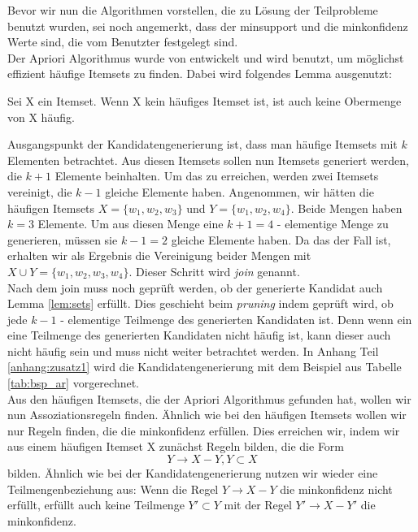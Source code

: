 Bevor wir nun die Algorithmen vorstellen, die zu Lösung der Teilprobleme benutzt wurden, sei noch angemerkt, dass der minsupport und die minkonfidenz Werte sind, die vom Benutzter festgelegt sind.
\\
Der Apriori Algorithmus wurde von \citet{AgImSw93} entwickelt und wird benutzt, um möglichst effizient häufige Itemsets zu finden. Dabei wird folgendes Lemma ausgenutzt:
\begin{lemma}
	Sei X ein Itemset. Wenn X kein häufiges Itemset ist, ist auch keine Obermenge von X häufig. \citep{AgImSw93}
	\label{lem:sets}
\end{lemma}
Ausgangspunkt der Kandidatengenerierung ist, dass man häufige Itemsets mit $k$ Elementen betrachtet. Aus diesen Itemsets sollen nun Itemsets generiert werden, die $k+1$ Elemente beinhalten. Um das zu erreichen, werden zwei Itemsets vereinigt, die $k-1$ gleiche Elemente haben. Angenommen, wir hätten die häufigen Itemsets $X = \{w_1, w_2, w_3\}$ und $Y = \{w_1, w_2, w_4\}$. Beide Mengen haben $k=3$ Elemente. Um aus diesen Menge eine $k+1=4$ - elementige Menge zu generieren, müssen sie $k-1=2$ gleiche Elemente haben. Da das der Fall ist, erhalten wir als Ergebnis die Vereinigung beider Mengen mit $X \cup Y = \{w_1, w_2, w_3, w_4\}$. Dieser Schritt wird \textit{join} genannt.\\
Nach dem join muss noch geprüft werden, ob der generierte Kandidat auch Lemma \ref{lem:sets} erfüllt. Dies geschieht beim \textit{pruning} indem geprüft wird, ob jede $k-1$ - elementige Teilmenge des generierten Kandidaten ist. Denn wenn ein eine Teilmenge des generierten Kandidaten nicht häufig ist, kann dieser auch nicht häufig sein und muss nicht weiter betrachtet werden. In Anhang Teil \ref{anhang:zusatz1} wird die Kandidatengenerierung mit dem Beispiel aus Tabelle \ref{tab:bsp_ar} vorgerechnet.
\\
Aus den häufigen Itemsets, die der Apriori Algorithmus gefunden hat, wollen wir nun Assoziationsregeln finden. Ähnlich wie bei den häufigen Itemsets wollen wir nur Regeln finden, die die minkonfidenz erfüllen. Dies erreichen wir, indem wir aus einem häufigen Itemset X zunächst Regeln bilden, die die Form 
\begin{equation*}
Y \rightarrow X - Y, Y \subset X
\end{equation*}
bilden. Ähnlich wie bei der Kandidatengenerierung nutzen wir wieder eine Teilmengenbeziehung aus: Wenn die Regel $Y \rightarrow X - Y$ die minkonfidenz nicht erfüllt, erfüllt auch keine Teilmenge $Y' \subset Y$ mit der Regel $Y' \rightarrow X - Y'$ die minkonfidenz.

\clearpage

